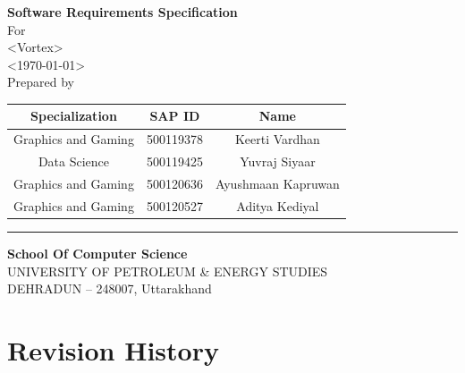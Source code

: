\documentclass[12pt,a4paper]{article}
\begin{document}
\begin{titlepage}
\centering

\vspace*{1.5cm}

{\Huge\bfseries Software Requirements Specification}\\[1.2cm]

{\large For}\\[0.4cm]

{\Large \textless Vortex\textgreater}\\[0.3cm]
{\Large \textless \today \textgreater}\\[1.2cm]

{\large Prepared by}\\[0.8cm]

\renewcommand{\arraystretch}{1.5}
\begin{tabular}{|c|c|c|}
\hline
\textbf{Specialization} & \textbf{SAP ID} & \textbf{Name} \\
\hline
Graphics and Gaming & 500119378 & Keerti Vardhan \\
\hline
Data Science & 500119425 & Yuvraj Siyaar \\
\hline
Graphics and Gaming & 500120636 & Ayushmaan Kapruwan \\
\hline
Graphics and Gaming & 500120527 & Aditya Kediyal \\
\hline
\end{tabular}

\vfill

\vspace{1cm}
\rule{0.3\textwidth}{1pt}
\vspace{0.5cm}

{\large\bfseries School Of Computer Science}\\[0.3cm]

{\large UNIVERSITY OF PETROLEUM \& ENERGY STUDIES}\\
{\large DEHRADUN -- 248007, Uttarakhand}

\end{titlepage}

\begin{singlespace}
\tableofcontents
\end{singlespace}

\listoffigures

\vspace{0.8cm}

\section*{Revision History}
\end{document}

